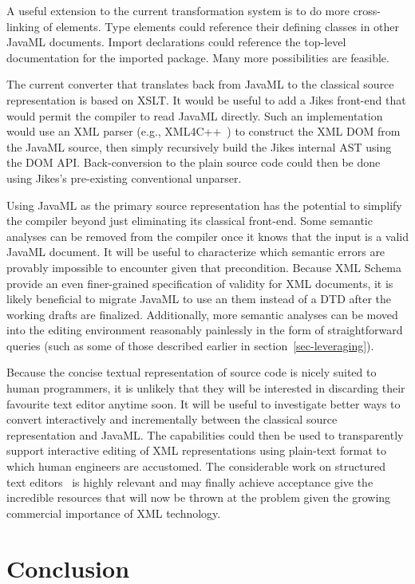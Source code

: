 \documentclass{article}
\begin{document}
\begin{multicols}{2}
A useful extension to the current transformation system is to do
more cross-linking of elements.  Type elements could reference their
defining classes in other JavaML documents.  Import declarations could
reference the top-level documentation for the imported package.  Many
more possibilities are feasible.

The current converter that translates back from JavaML to the classical
source representation is based on XSLT.  It would be useful to add a
Jikes front-end that would permit the compiler to read JavaML directly.
Such an implementation would use an XML parser (e.g.,
XML4C++~\cite{XML4C++}) to construct the XML DOM from the JavaML source,
then simply recursively build the Jikes internal AST using the DOM API.
Back-conversion to the plain source code could then be done using
Jikes's pre-existing conventional unparser.

Using JavaML as the primary source representation has the potential to
simplify the compiler beyond just eliminating its classical front-end.
Some semantic analyses can be removed from the compiler once it knows
that the input is a valid JavaML document.  It will be useful to
characterize which semantic errors are provably impossible to encounter
given that precondition.  Because XML
Schema~\cite{XMLSchema1,XMLSchema2} provide an even finer-grained
specification of validity for XML documents, it is likely beneficial to
migrate JavaML to use an them instead of a DTD after the working drafts
are finalized.  Additionally, more semantic analyses can be moved into
the editing environment reasonably painlessly in the form of
straightforward queries (such as some of those described earlier in
section~\ref{sec-leveraging}).

Because the concise textual representation of source code is nicely
suited to human programmers, it is unlikely that they will be interested
in discarding their favourite text editor anytime soon.  It will be
useful to investigate better ways to convert interactively and
incrementally between the classical source representation and JavaML.
The capabilities could then be used to transparently support interactive
editing of XML representations using plain-text format to which human
engineers are accustomed.  The considerable work on structured text
editors~\cite{Miller99} is highly relevant and may finally achieve acceptance give the
incredible resources that will now be thrown at the problem given the
growing commercial importance of XML technology.

\section{Conclusion}
\label{sec-conclusion}


\end{multicols}
\end{document}

